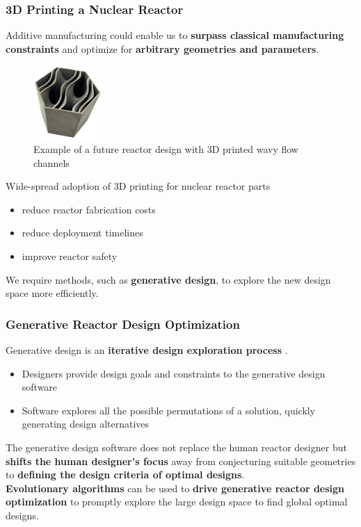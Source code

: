 \begin{frame}
    \frametitle{3D Printing a Nuclear Reactor}
    Additive manufacturing could enable us to \textbf{surpass classical 
    manufacturing constraints} and optimize for \textbf{arbitrary geometries and 
    parameters}. 
    \begin{figure}[]
        \includegraphics[width=0.2\linewidth]{figures/wavy-channels.png}
        \caption{Example of a future reactor design with 3D printed wavy flow channels}
    \end{figure}
    Wide-spread adoption of 3D printing for nuclear reactor parts 
    \begin{itemize}
        \item reduce reactor fabrication costs 
        \item reduce deployment timelines 
        \item improve reactor safety 
    \end{itemize}
    \vspace{0.2cm}
    We require methods, such as \textbf{generative design}, to explore the 
    new design space more efficiently. 
\end{frame}

  \begin{frame}
    \frametitle{Generative Reactor Design Optimization}
    Generative design is an \textbf{iterative design exploration process} \cite{autodesk_autodesk_2020}. 
    \begin{itemize}
        \item Designers provide design goals and constraints to the generative design 
        software
        \item Software explores all the possible permutations of a solution, quickly generating 
        design alternatives
    \end{itemize}
    \vspace{0.2cm}
    The generative design software does not replace the human reactor designer but 
    \textbf{shifts the human designer's focus} away from conjecturing suitable geometries 
    to \textbf{defining the design criteria of optimal designs}. \\

    \textbf{Evolutionary algorithms} can be used to \textbf{drive generative reactor 
    design optimization} to promptly explore the large design space to find global optimal 
    designs. 
  \end{frame}

